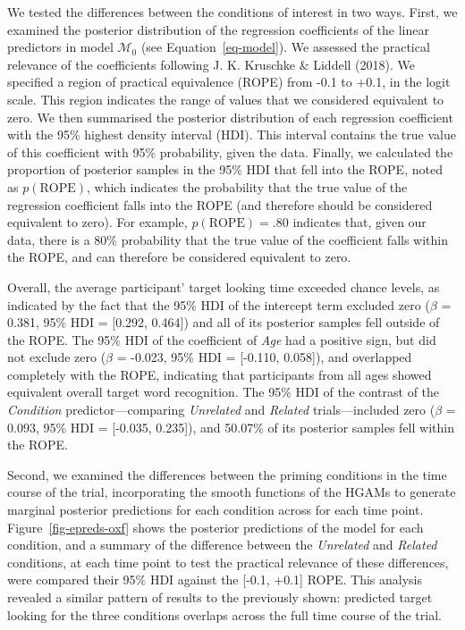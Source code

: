\documentclass[
  12pt,
  b5paperpaper,
  twoside]{scrreprt}
\begin{document}
We tested the differences between the conditions of interest in two
ways. First, we examined the posterior distribution of the regression
coefficients of the linear predictors in model \(\mathcal{M}_0\) (see
Equation~\ref{eq-model}). We assessed the practical relevance of the
coefficients following J. K. Kruschke \& Liddell (2018). We specified a
region of practical equivalence (ROPE) from -0.1 to +0.1, in the logit
scale. This region indicates the range of values that we considered
equivalent to zero. We then summarised the posterior distribution of
each regression coefficient with the 95\% highest density interval
(HDI). This interval contains the true value of this coefficient with
95\% probability, given the data. Finally, we calculated the proportion
of posterior samples in the 95\% HDI that fell into the ROPE, noted as
\(p(\text{ROPE})\), which indicates the probability that the true value
of the regression coefficient falls into the ROPE (and therefore should
be considered equivalent to zero). For example, \(p(\text{ROPE})=.80\)
indicates that, given our data, there is a 80\% probability that the
true value of the coefficient falls within the ROPE, and can therefore
be considered equivalent to zero.

Overall, the average participant' target looking time exceeded chance
levels, as indicated by the fact that the 95\% HDI of the intercept term
excluded zero (\(\beta\) = 0.381, 95\% HDI = {[}0.292, 0.464{]}) and all
of its posterior samples fell outside of the ROPE. The 95\% HDI of the
coefficient of \emph{Age} had a positive sign, but did not exclude zero
(\(\beta\) = -0.023, 95\% HDI = {[}-0.110, 0.058{]}), and overlapped
completely with the ROPE, indicating that participants from all ages
showed equivalent overall target word recognition. The 95\% HDI of the
contrast of the \emph{Condition} predictor---comparing \emph{Unrelated}
and \emph{Related} trials---included zero (\(\beta\) = 0.093, 95\% HDI =
{[}-0.035, 0.235{]}), and 50.07\% of its posterior samples fell within
the ROPE.

Second, we examined the differences between the priming conditions in
the time course of the trial, incorporating the smooth functions of the
HGAMs to generate marginal posterior predictions for each condition
across for each time point. Figure~\ref{fig-epreds-oxf} shows the
posterior predictions of the model for each condition, and a summary of
the difference between the \emph{Unrelated} and \emph{Related}
conditions, at each time point to test the practical relevance of these
differences, were compared their 95\% HDI against the {[}-0.1, +0.1{]}
ROPE. This analysis revealed a similar pattern of results to the
previously shown: predicted target looking for the three conditions
overlaps across the full time course of the trial.
\end{document}
